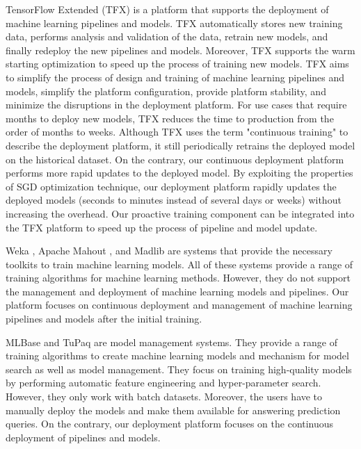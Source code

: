 TensorFlow Extended (TFX) is a platform that supports the deployment of machine learning pipelines and models.
TFX automatically stores new training data, performs analysis and validation of the data, retrain new models, and finally redeploy the new pipelines and models. 
Moreover, TFX supports the warm starting optimization to speed up the process of training new models.
TFX aims to simplify the process of design and training of machine learning pipelines and models, simplify the platform configuration, provide platform stability, and minimize the disruptions in the deployment platform.
For use cases that require months to deploy new models, TFX reduces the time to production from the order of months to weeks.
Although TFX uses the term "continuous training" to describe the deployment platform, it still periodically retrains the deployed model on the historical dataset.
On the contrary, our continuous deployment platform performs more rapid updates to the deployed model.
By exploiting the properties of SGD optimization technique, our deployment platform rapidly updates the deployed models (seconds to minutes instead of several days or weeks) without increasing the overhead.
Our proactive training component can be integrated into the TFX platform to speed up the process of pipeline and model update.

Weka \cite{hall2009weka}, Apache Mahout \cite{Owen:2011:MA:2132656}, and Madlib \cite{hellerstein2012madlib} are systems that provide the necessary toolkits to train machine learning models. 
All of these systems provide a range of training algorithms for machine learning methods. 
However, they do not support the management and deployment of machine learning models and pipelines. 
Our platform focuses on continuous deployment and management of machine learning pipelines and models after the initial training.

MLBase \cite{kraska2013mlbase} and TuPaq \cite{sparks2015tupaq} are model management systems.
They provide a range of training algorithms to create machine learning models and mechanism for model search as well as model management.
They focus on training high-quality models by performing automatic feature engineering and hyper-parameter search.
However, they only work with batch datasets.
Moreover, the users have to manually deploy the models and make them available for answering prediction queries.
On the contrary, our deployment platform focuses on the continuous deployment of pipelines and models.
